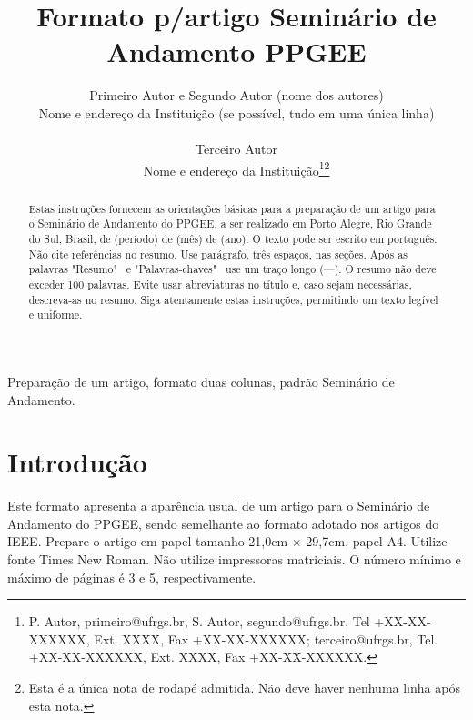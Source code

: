 \documentclass{ppgeesa}
\begin{document}
\title{Formato p/artigo Seminário de Andamento PPGEE}

\author{Primeiro Autor e Segundo Autor (nome dos autores)\\
{\small Nome e endereço da Instituição (se possível, tudo em uma única linha)}\\
~\\
Terceiro Autor\\
{\small Nome e endereço da Instituição}\thanks{P. Autor, primeiro@ufrgs.br, S. Autor, segundo@ufrgs.br, Tel
+XX-XX-XXXXXX, Ext. XXXX, Fax +XX-XX-XXXXXX; terceiro@ufrgs.br, Tel.
+XX-XX-XXXXXX, Ext. XXXX, Fax +XX-XX-XXXXXX.}\thanks{Esta é a única nota de
rodapé admitida. Não deve haver nenhuma linha após esta nota.}}

\maketitle
\thispagestyle{empty}\pagestyle{empty}

\begin{abstract}
Estas instruções fornecem as orientações básicas para a preparação de um
artigo para o Seminário de Andamento do PPGEE, a ser realizado em Porto
Alegre, Rio Grande do Sul, Brasil, de (período) de (mês) de (ano). O texto
pode ser escrito em português. Não cite referências no resumo. Use
parágrafo, três espaços, nas seções. Após as palavras "Resumo"~ e
"Palavras-chaves"~ use um traço longo (---).  O resumo não deve exceder 100
palavras. Evite usar abreviaturas no título e, caso sejam necessárias,
descreva-as no resumo. Siga atentamente estas instruções, permitindo um
texto legível e uniforme.
\end{abstract}

\begin{IEEEkeywords}
Preparação de um artigo, formato duas colunas, padrão Seminário de
Andamento.
\end{IEEEkeywords}

\section{Introdução}

Este formato apresenta a aparência usual de um artigo para o Seminário de
Andamento do PPGEE, sendo semelhante ao formato adotado nos artigos do IEEE.
Prepare o artigo em papel tamanho 21,0cm $\times$ 29,7cm, papel A4. Utilize
fonte Times New Roman. Não utilize impressoras matriciais. O número mínimo e
máximo de páginas é 3 e 5, respectivamente.
\end{document}
